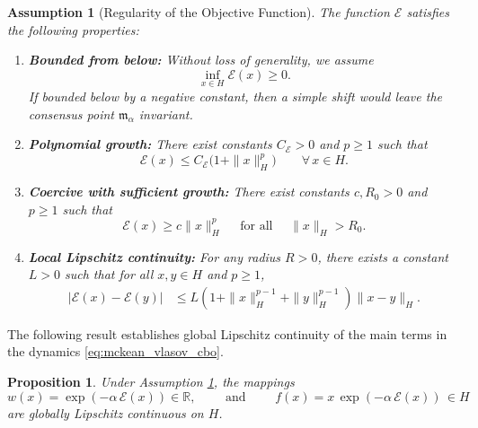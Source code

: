 \documentclass[12pt]{amsart}
\numberwithin{equation}{section}
\newtheorem{assumption}[theorem]{Assumption}
\newtheorem{proposition}[theorem]{Proposition}
\begin{document}
\begin{assumption}[Regularity of the Objective Function]
\label{assum:objective}
The function $\mathscr{E}$ satisfies the following properties:
\begin{enumerate}
    \item \textbf{Bounded from below:} Without loss of generality, we assume 
    \begin{equation*}
        \inf_{x \in H} \mathscr{E}(x) \geq 0 .
    \end{equation*}
    If bounded below by a negative constant, then a simple shift would leave the consensus point $\mathfrak{m}_\alpha$ invariant. 
    \item \textbf{Polynomial growth:} There exist constants $C_{\mathscr{E}} > 0$ and $p \geq 1$ such that 
    \begin{equation*}
        \mathscr{E}(x) \leq C_{\mathscr{E}} \big(1 + \|x\|_H^p\big) \qquad \forall\, x\in H.
    \end{equation*}
    \item  \textbf{Coercive with sufficient growth:} There exist constants $c, R_0 > 0$ and $p \geq 1$ such that 
       \begin{equation*}
       \mathscr{E}(x) \geq c\|x\|_H^p \quad \mbox{ for all }\quad \|x\|_H > R_0.
    \end{equation*}
    \item \textbf{Local Lipschitz continuity:} For any radius $R > 0$, there exists a constant $L > 0$ such that for all $x, y \in H$ and $p\geq 1$,
    \begin{equation*}
    \begin{aligned}
        |\mathscr{E}(x) - \mathscr{E}(y)|
        & \leq L(1+\|x\|_H^{p-1}+\|y\|_H^{p-1})\|x - y\|_H.
    \end{aligned}
    \end{equation*}
\end{enumerate}
\end{assumption}

The following result establishes global Lipschitz continuity of the main terms in the dynamics \eqref{eq:mckean_vlasov_cbo}.

\begin{proposition}
\label{prop:global_lipschitz}
Under Assumption \ref{assum:objective}, the mappings 
\begin{equation*}
    w(x) = \exp(-\alpha\, \mathscr{E}(x)) \in \mathbb{R}, \qquad \text{ and } \qquad f(x) = x\,\exp(-\alpha\, \mathscr{E}(x)) \,\in H
\end{equation*}
are globally Lipschitz continuous on $H$.
\end{proposition}
\end{document}
